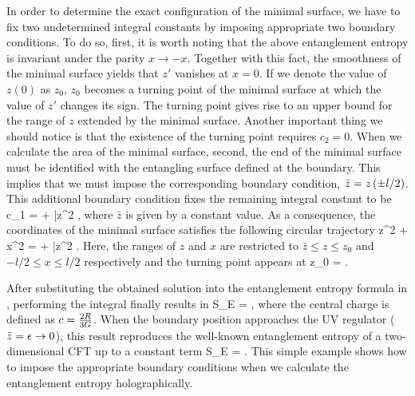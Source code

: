 \documentclass[12pt]{article}
\begin{document}
In order to determine the exact configuration of the minimal surface, we have to fix two undetermined integral constants by imposing appropriate two boundary conditions. To do so, first, it is worth noting that the above entanglement entropy is invariant under the parity $x \to -x$. Together with this fact, the smoothness of the minimal surface yields that $z'$ vanishes at $x=0$. If we denote the value of $z(0)$ as $z_0$, $z_0$ becomes a turning point of the minimal surface at which the value of $z'$ changes its sign. The turning point gives rise to an upper bound for the range of $z$ extended by the minimal surface. Another important thing we should notice is that the existence of the turning point requires $c_2 = 0$. When we calculate the area of the minimal surface, second, the end of the minimal surface must be identified with the entangling surface defined at the boundary. This implies that we must impose the corresponding boundary condition, $\bar{z} = z \left( \pm l/2 \right)$. This additional boundary condition fixes the remaining integral constant to be
\be
c_1 =  + \bar{z}^2 ,
\ee
where $\bar{z}$ is given by a constant value. As a consequence, the coordinates of the minimal surface satisfies the following circular trajectory
\be
z^2 + x^2 =  + \bar{z}^2 .
\ee
Here, the ranges of $z$ and $x$ are restricted to $\bar{z} \le z \le z_0$ and $-l/2 \le x \le l/2$ respectively and the turning point appears at
\be
z_0 =  .
\ee


After substituting the obtained solution into the entanglement entropy formula in , performing the integral finally results in
\be
S_E =  \log \ls {} \rs ,
\ee
where the central charge is defined as $c= \frac{2 R}{ 3 G}$. When the boundary position approaches the UV regulator ($\bar{z}=\epsilon \to 0$), this result reproduces the well-known entanglement entropy of a two-dimensional CFT up to a constant term
\be
S_E =  \log {} .
\ee
This simple example shows how to impose the appropriate boundary conditions when we calculate the entanglement entropy holographically.
\end{document}
